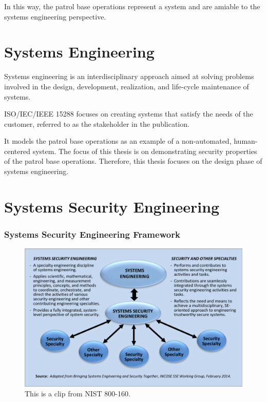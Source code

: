 \documentclass[../../main/main.tex]{subfiles}
\begin{document}
In this way, the patrol base operations represent a system and are amiable to the systems engineering perspective.  

\section{Systems Engineering}\label{sec:se}
Systems engineering is an interdisciplinary approach aimed at solving problems involved in the design, development, realization, and life-cycle maintenance of systems.
  

ISO/IEC/IEEE 15288 focuses on creating systems that satisfy the needs of the customer, referred to as the stakeholder in the publication.  

It models the patrol base operations \cite{rangermanual} as an example of a non-automated, human-centered system.  The focus of this thesis is on demonstrating security properties of the patrol base operations.  Therefore, this thesis focuses on the design phase of systems engineering. 


\section{Systems Security Engineering}\label{sec:sse}

\subsubsection{Systems Security Engineering Framework}\label{sssec:sseframework}

\begin{figure}[ht]
\includegraphics[width=\linewidth]{../figures/seincontext.png}
\caption{This is a clip from NIST 800-160.}
\label{fig:nist800160}
\end{figure}
\end{document}

